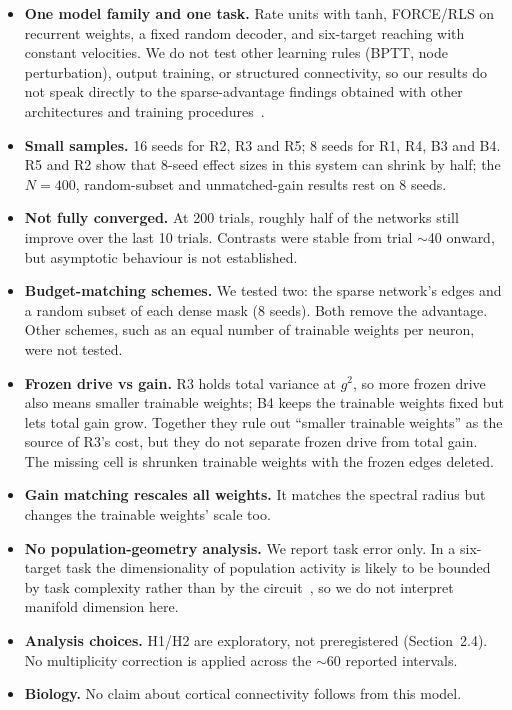 \documentclass[11pt]{article}
\begin{document}
\begin{itemize}
\item \textbf{One model family and one task.} Rate units with tanh,
FORCE/RLS on recurrent weights, a fixed random decoder, and six-target
reaching with constant velocities. We do not test other learning rules
(BPTT, node perturbation), output training, or structured connectivity, so
our results do not speak directly to the sparse-advantage findings obtained
with other architectures and training
procedures~\cite{khona2023winning,fruengel2025sparse}.
\item \textbf{Small samples.} 16 seeds for R2, R3 and R5; 8 seeds for R1, R4,
B3 and B4. R5 and R2 show that 8-seed effect sizes in this system can shrink
by half; the $N=400$, random-subset and unmatched-gain results rest on 8
seeds.
\item \textbf{Not fully converged.} At 200 trials, roughly half of the
networks still improve over the last 10 trials. Contrasts were stable from
trial $\sim$40 onward, but asymptotic behaviour is not established.
\item \textbf{Budget-matching schemes.} We tested two: the sparse network's
edges and a random subset of each dense mask (8 seeds). Both remove the
advantage. Other schemes, such as an equal number of trainable weights per
neuron, were not tested.
\item \textbf{Frozen drive vs gain.} R3 holds total variance at $g^2$, so
more frozen drive also means smaller trainable weights; B4 keeps the
trainable weights fixed but lets total gain grow. Together they rule out
``smaller trainable weights'' as the source of R3's cost, but they do not
separate frozen drive from total gain. The missing cell is shrunken trainable
weights with the frozen edges deleted.
\item \textbf{Gain matching rescales all weights.} It matches the spectral
radius but changes the trainable weights' scale too.
\item \textbf{No population-geometry analysis.} We report task error only.
In a six-target task the dimensionality of population activity is likely to
be bounded by task complexity rather than by the circuit~\cite{gao2017theory},
so we do not interpret manifold dimension here.
\item \textbf{Analysis choices.} H1/H2 are exploratory, not preregistered
(Section~2.4). No multiplicity correction is applied across the $\sim$60
reported intervals.
\item \textbf{Biology.} No claim about cortical connectivity follows from
this model.
\end{itemize}
\end{document}
